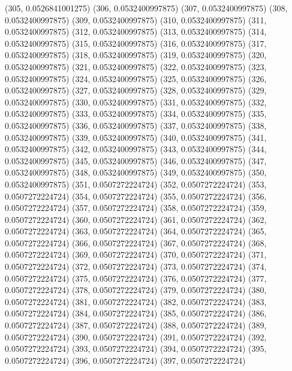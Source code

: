 {					(305, 0.0526841001275)
					(306, 0.0532400997875)
					(307, 0.0532400997875)
					(308, 0.0532400997875)
					(309, 0.0532400997875)
					(310, 0.0532400997875)
					(311, 0.0532400997875)
					(312, 0.0532400997875)
					(313, 0.0532400997875)
					(314, 0.0532400997875)
					(315, 0.0532400997875)
					(316, 0.0532400997875)
					(317, 0.0532400997875)
					(318, 0.0532400997875)
					(319, 0.0532400997875)
					(320, 0.0532400997875)
					(321, 0.0532400997875)
					(322, 0.0532400997875)
					(323, 0.0532400997875)
					(324, 0.0532400997875)
					(325, 0.0532400997875)
					(326, 0.0532400997875)
					(327, 0.0532400997875)
					(328, 0.0532400997875)
					(329, 0.0532400997875)
					(330, 0.0532400997875)
					(331, 0.0532400997875)
					(332, 0.0532400997875)
					(333, 0.0532400997875)
					(334, 0.0532400997875)
					(335, 0.0532400997875)
					(336, 0.0532400997875)
					(337, 0.0532400997875)
					(338, 0.0532400997875)
					(339, 0.0532400997875)
					(340, 0.0532400997875)
					(341, 0.0532400997875)
					(342, 0.0532400997875)
					(343, 0.0532400997875)
					(344, 0.0532400997875)
					(345, 0.0532400997875)
					(346, 0.0532400997875)
					(347, 0.0532400997875)
					(348, 0.0532400997875)
					(349, 0.0532400997875)
					(350, 0.0532400997875)
					(351, 0.0507272224724)
					(352, 0.0507272224724)
					(353, 0.0507272224724)
					(354, 0.0507272224724)
					(355, 0.0507272224724)
					(356, 0.0507272224724)
					(357, 0.0507272224724)
					(358, 0.0507272224724)
					(359, 0.0507272224724)
					(360, 0.0507272224724)
					(361, 0.0507272224724)
					(362, 0.0507272224724)
					(363, 0.0507272224724)
					(364, 0.0507272224724)
					(365, 0.0507272224724)
					(366, 0.0507272224724)
					(367, 0.0507272224724)
					(368, 0.0507272224724)
					(369, 0.0507272224724)
					(370, 0.0507272224724)
					(371, 0.0507272224724)
					(372, 0.0507272224724)
					(373, 0.0507272224724)
					(374, 0.0507272224724)
					(375, 0.0507272224724)
					(376, 0.0507272224724)
					(377, 0.0507272224724)
					(378, 0.0507272224724)
					(379, 0.0507272224724)
					(380, 0.0507272224724)
					(381, 0.0507272224724)
					(382, 0.0507272224724)
					(383, 0.0507272224724)
					(384, 0.0507272224724)
					(385, 0.0507272224724)
					(386, 0.0507272224724)
					(387, 0.0507272224724)
					(388, 0.0507272224724)
					(389, 0.0507272224724)
					(390, 0.0507272224724)
					(391, 0.0507272224724)
					(392, 0.0507272224724)
					(393, 0.0507272224724)
					(394, 0.0507272224724)
					(395, 0.0507272224724)
					(396, 0.0507272224724)
					(397, 0.0507272224724)
}
